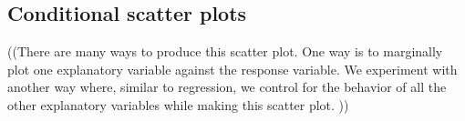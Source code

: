 \subsection{Conditional scatter plots}
\label{sec:visualizer:scatterplot:conditional}

((There are many ways to produce this scatter plot. One way is to marginally plot one explanatory variable against the response variable. We experiment with another way where, similar to regression, we control for the behavior of all the other explanatory variables while making this scatter plot. ))
